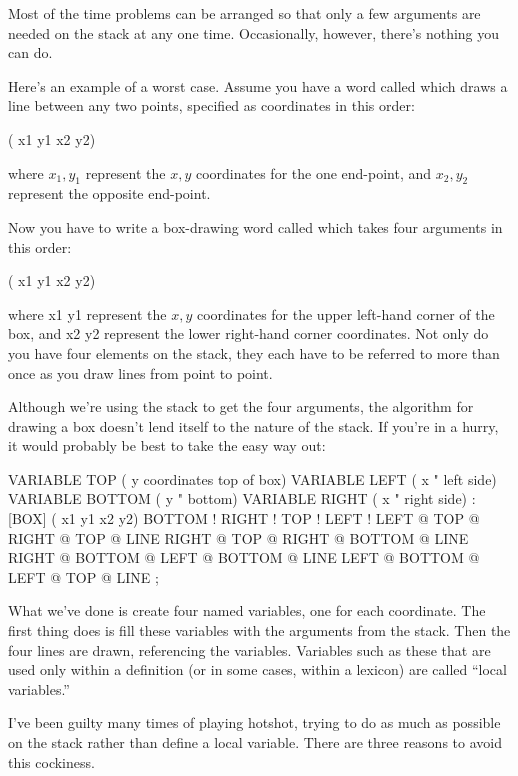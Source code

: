 Most of the time problems can be arranged so that only a few arguments
are needed on the stack at any one time. Occasionally, however, there's
nothing you can do.

Here's an example of a worst case. Assume you have a word called
 which draws a line between any two points, specified as coordinates
in this order:

\begin{Code}
( x1 y1 x2 y2)
\end{Code}
where $x_1,y_1$ represent the $x,y$ coordinates for the one end-point, and
$x_2,y_2$ represent the opposite end-point.

Now you have to write a box-drawing word called \forth{[BOX]} which
takes four arguments in this order:

\begin{Code}
( x1 y1 x2 y2)
\end{Code}
where x1 y1 represent the $x,y$ coordinates for the upper left-hand corner
of the box, and x2 y2 represent the lower right-hand corner coordinates.
Not only do you have four elements on the stack, they each have to
be referred to more than once as you draw lines from point to point.

Although we're using the stack to get the four arguments, the algorithm
for drawing a box doesn't lend itself to the nature of the stack. If you're
in a hurry, it would probably be best to take the easy way out:

\begin{Code}
VARIABLE TOP         ( y coordinates top of box)
VARIABLE LEFT        ( x     "       left side)
VARIABLE BOTTOM      ( y     "       bottom)
VARIABLE RIGHT       ( x     "       right side)
: [BOX]   ( x1 y1 x2 y2)   BOTTOM !  RIGHT !  TOP !  LEFT !
   LEFT @ TOP @  RIGHT @ TOP @  LINE
   RIGHT @ TOP @  RIGHT @ BOTTOM @  LINE
   RIGHT @ BOTTOM @  LEFT @ BOTTOM @  LINE
   LEFT @ BOTTOM @  LEFT @ TOP @  LINE ;
\end{Code}
What we've done is create four named variables, one for each coordinate.
The first thing \forth{[BOX]} does is fill these variables with the arguments from
the stack. Then the four lines are drawn, referencing the variables.
Variables such as these that are used only within a definition (or in some
cases, within a lexicon) are called ``local variables.''

I've been guilty many times of playing hotshot, trying to do as
much as possible on the stack rather than define a local variable. There
are three reasons to avoid this cockiness.

